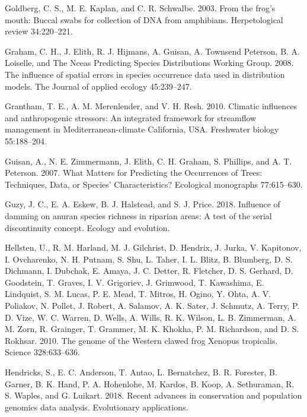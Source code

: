 \documentclass[proquest,12pt,final]{ucthesis-CA2012} %
\begin{document}
\begin{ucmainmatter}
\leavevmode\hypertarget{ref-goldberg_frogs_2003}{}%
Goldberg, C. S., M. E. Kaplan, and C. R. Schwalbe. 2003. From the frog's
mouth: Buccal swabs for collection of DNA from amphibians.
Herpetological review 34:220--221.

\leavevmode\hypertarget{ref-graham_influence_2008}{}%
Graham, C. H., J. Elith, R. J. Hijmans, A. Guisan, A. Townsend Peterson,
B. A. Loiselle, and The Nceas Predicting Species Distributions Working
Group. 2008. The influence of spatial errors in species occurrence data
used in distribution models. The Journal of applied ecology 45:239--247.

\leavevmode\hypertarget{ref-grantham_climatic_2010}{}%
Grantham, T. E., A. M. Merenlender, and V. H. Resh. 2010. Climatic
influences and anthropogenic stressors: An integrated framework for
streamflow management in Mediterranean-climate California, USA.
Freshwater biology 55:188--204.

\leavevmode\hypertarget{ref-guisan_what_2007}{}%
Guisan, A., N. E. Zimmermann, J. Elith, C. H. Graham, S. Phillips, and
A. T. Peterson. 2007. What Matters for Predicting the Occurrences of
Trees: Techniques, Data, or Species' Characteristics? Ecological
monographs 77:615--630.

\leavevmode\hypertarget{ref-guzy_influence_2018}{}%
Guzy, J. C., E. A. Eskew, B. J. Halstead, and S. J. Price. 2018.
Influence of damming on anuran species richness in riparian areas: A
test of the serial discontinuity concept. Ecology and evolution.

\leavevmode\hypertarget{ref-hellsten_genome_2010}{}%
Hellsten, U., R. M. Harland, M. J. Gilchrist, D. Hendrix, J. Jurka, V.
Kapitonov, I. Ovcharenko, N. H. Putnam, S. Shu, L. Taher, I. L. Blitz,
B. Blumberg, D. S. Dichmann, I. Dubchak, E. Amaya, J. C. Detter, R.
Fletcher, D. S. Gerhard, D. Goodstein, T. Graves, I. V. Grigoriev, J.
Grimwood, T. Kawashima, E. Lindquist, S. M. Lucas, P. E. Mead, T.
Mitros, H. Ogino, Y. Ohta, A. V. Poliakov, N. Pollet, J. Robert, A.
Salamov, A. K. Sater, J. Schmutz, A. Terry, P. D. Vize, W. C. Warren, D.
Wells, A. Wills, R. K. Wilson, L. B. Zimmerman, A. M. Zorn, R. Grainger,
T. Grammer, M. K. Khokha, P. M. Richardson, and D. S. Rokhsar. 2010. The
genome of the Western clawed frog Xenopus tropicalis. Science
328:633--636.

\leavevmode\hypertarget{ref-hendricks_recent_2018}{}%
Hendricks, S., E. C. Anderson, T. Antao, L. Bernatchez, B. R. Forester,
B. Garner, B. K. Hand, P. A. Hohenlohe, M. Kardos, B. Koop, A.
Sethuraman, R. S. Waples, and G. Luikart. 2018. Recent advances in
conservation and population genomics data analysis. Evolutionary
applications.


\end{ucmainmatter}
\end{document}

